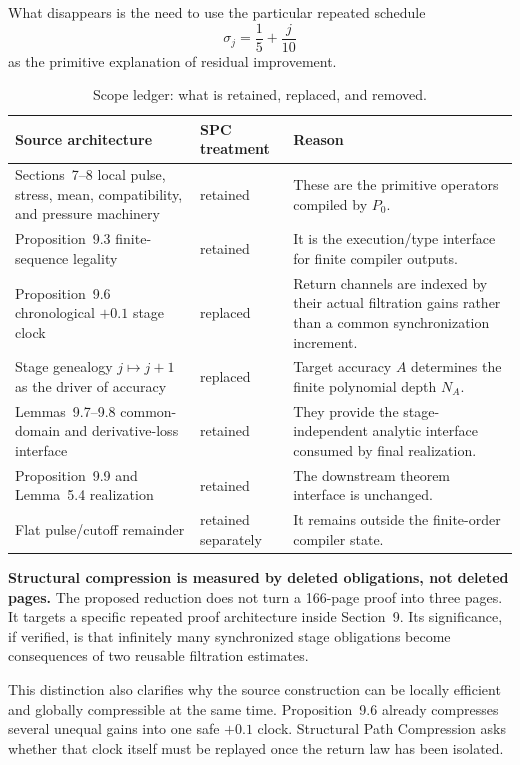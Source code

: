 \documentclass[11pt]{article}
\numberwithin{equation}{section}
\theoremstyle{highend}
\theoremstyle{definition}
\begin{document}
What disappears is the need to use the particular repeated schedule
\[
\sigma_j=\frac15+\frac{j}{10}
\]
as the primitive explanation of residual improvement.

\begin{table}[h]
\centering
\caption{Scope ledger: what is retained, replaced, and removed.}
\label{tab:scopeledger}
\begin{tabularx}{\textwidth}{@{}p{}p{}X@{}}
\toprule
Source architecture & SPC treatment & Reason \\
\midrule
Sections~7--8 local pulse, stress, mean, compatibility, and pressure machinery & retained & These are the primitive operators compiled by $P_0$. \\
Proposition~9.3 finite-sequence legality & retained & It is the execution/type interface for finite compiler outputs. \\
Proposition~9.6 chronological $+0.1$ stage clock & replaced & Return channels are indexed by their actual filtration gains rather than a common synchronization increment. \\
Stage genealogy $j\mapsto j+1$ as the driver of accuracy & replaced & Target accuracy $A$ determines the finite polynomial depth $N_A$. \\
Lemmas~9.7--9.8 common-domain and derivative-loss interface & retained & They provide the stage-independent analytic interface consumed by final realization. \\
Proposition~9.9 and Lemma~5.4 realization & retained & The downstream theorem interface is unchanged. \\
Flat pulse/cutoff remainder & retained separately & It remains outside the finite-order compiler state. \\
\bottomrule
\end{tabularx}
\end{table}

\begin{keybox}
\textbf{Structural compression is measured by deleted obligations, not deleted pages.}
The proposed reduction does not turn a 166-page proof into three pages. It targets a specific repeated proof architecture inside Section~9. Its significance, if verified, is that infinitely many synchronized stage obligations become consequences of two reusable filtration estimates.
\end{keybox}

This distinction also clarifies why the source construction can be locally efficient and globally compressible at the same time. Proposition~9.6 already compresses several unequal gains into one safe $+0.1$ clock. Structural Path Compression asks whether that clock itself must be replayed once the return law has been isolated.
\end{document}
